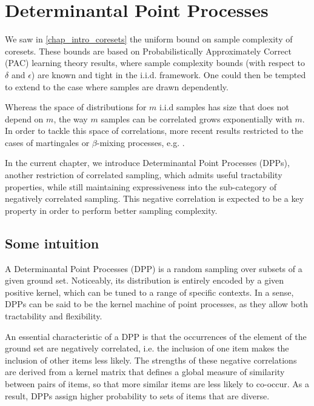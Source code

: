 \chapter{Determinantal Point Processes}
\label{chap_DPP}
We saw in \cref{chap_intro_coresets} the uniform bound on sample complexity of coresets. These bounds are based on Probabilistically Approximately Correct (PAC) learning theory results, where sample complexity bounds (with respect to $\delta$ and $\epsilon$) are known and tight in the i.i.d. framework. One could then be tempted to extend to the case where samples are drawn dependently.

Whereas the space of distributions for $m$ i.i.d samples has size that does not depend on $m$, the way $m$ samples can be correlated grows exponentially with $m$. In order to tackle this space of correlations, more recent results restricted to the cases of martingales or $\beta$-mixing processes, e.g. \cite{gao2016_learnability_beta_mixing}.

In the current chapter, we introduce Determinantal Point Processes (DPPs), another restriction of correlated sampling, which admits useful tractability properties, while still maintaining expressiveness into the sub-category of negatively correlated sampling. This negative correlation is expected to be a key property in order to perform better sampling complexity.

\section{Some intuition}

A Determinantal Point Processes (DPP) is a random sampling over subsets of a given ground set. Noticeably, its distribution is entirely encoded by a given positive kernel, which can be tuned to a range of specific contexts. In a sense, DPPs can be said to be the kernel machine of point processes, as they allow both tractability and flexibility. 

An essential characteristic of a DPP is that the occurrences of the element of the ground set are negatively correlated, i.e. the inclusion of one item makes the inclusion of other items less likely. The strengths of these negative correlations are derived from a kernel matrix that defines a global measure of similarity between pairs of items, so that more similar items are less likely to co-occur. As a result, DPPs assign higher probability to sets of items that are diverse.




